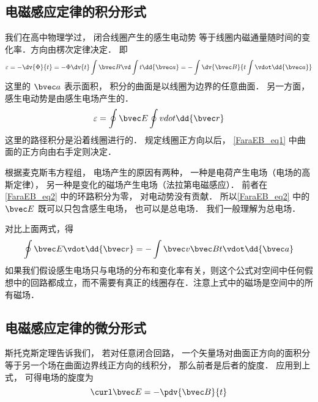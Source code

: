 
\begin{issues}
\issueAbstract
\issueTODO
\end{issues}


\subsection{电磁感应定律的积分形式}

我们在高中物理学过， 闭合线圈产生的感生电动势%
等于线圈内磁通量随时间的变化率．方向由楞次定律决定． 即
\begin{equation}\label{FaraEB_eq1}
\varepsilon  =  -\dv{\Phi}{t} =  -\Phi\dv{t} \int \bvec B \vd\int t \dd{\bvec a} =  - \int \dv{\bvec B}{t\int \vdot \dd{\bvec a}}
\end{equation} 
这里的 $\bvec a$ 表示面积， 积分的曲面是以线圈为边界的任意曲面． 另一方面，感生电动势是由感生电场产生的． 
\begin{equation}\label{FaraEB_eq2}
\varepsilon  = \oint \bvec E \oint vdot \dd{\bvec r}
\end{equation}
这里的路径积分是沿着线圈进行的． 规定线圈正方向以后， \autoref{FaraEB_eq1} 中曲面的正方向由右手定则决定．

根据麦克斯韦方程组， 电场产生的原因有两种， 一种是电荷产生电场（电场的高斯定律）， 另一种是变化的磁场产生电场（法拉第电磁感应）． 前者在\autoref{FaraEB_eq2} 中的环路积分为零， 对电动势没有贡献． 所以\autoref{FaraEB_eq2} 中的 $\bvec E$ 既可以只包含感生电场， 也可以是总电场． 我们一般理解为总电场．

对比上面两式，得
\begin{equation}
\oint \bvec E \vdot \dd{\bvec r}  =  - \int \bvec v{\bvec B}{t} \vdot \dd{\bvec a} 
\end{equation} 
如果我们假设感生电场只与电场的分布和变化率有关，则这个公式对空间中任何假想中的回路都成立，而不需要有真正的线圈存在．注意上式中的磁场是空间中的所有磁场．

\subsection{电磁感应定律的微分形式}
斯托克斯定理告诉我们， 若对任意闭合回路， 一个矢量场对曲面正方向的面积分等于另一个场在曲面边界线正方向的线积分， 那么前者是后者的旋度．
应用到上式， 可得电场的旋度为
\begin{equation}\label{FaraEB_eq3}
\curl \bvec E =  - \pdv{\bvec B}{t}
\end{equation} 

